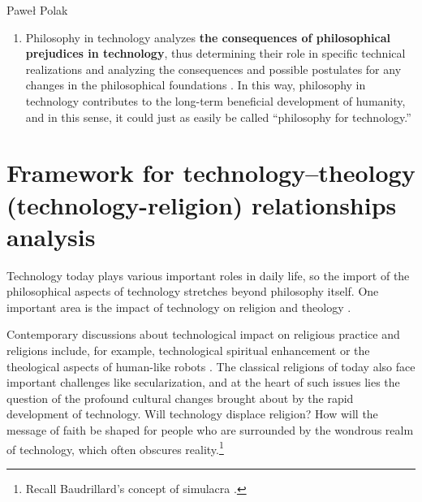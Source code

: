 \begin{artengenv}{Paweł Polak}
\begin{enumerate}[label=(\Roman*)]
\item Philosophy in technology analyzes \textbf{the consequences of philosophical prejudices in technology}, thus determining their role in specific technical realizations and analyzing the consequences and possible postulates for any changes in the philosophical foundations 
\parencites[e.g][]{smith_promise_2019}[][]{suchacka_human_2021}[][]{wieczorek_conscience_2021}. %
 In this way, philosophy in technology contributes to the long-term beneficial development of humanity, and in this sense, it could just as easily be called ``philosophy for technology.''
\end{enumerate}


\section[Framework for technology–theology (technology-religion) relationships analysis]{Framework for technology–theology (technology-religion) relationships analysis\footnotemark}


Technology today plays various important roles in daily life, so the import of the philosophical aspects of technology stretches beyond philosophy itself. One important area is the impact of technology on religion and theology 
\parencite[e.g][]{salamon_religia_2016}.%




Contemporary discussions about technological impact on religious practice and religions include, for example, technological spiritual enhancement 
\parencite[e.g][]{wildman_spirit_2021} %
 or the theological aspects of human-like robots 
\parencite[][]{balle_theological_2022}. %
 The classical religions of today also face important challenges like secularization, and at the heart of such issues lies the question of the profound cultural changes brought about by the rapid development of technology. Will technology displace religion? How will the message of faith be shaped for people who are surrounded by the wondrous realm of technology, which often obscures reality.\footnote{Recall Baudrillard's concept of simulacra 
\parencite[][]{baudrillard_simulacra_1994}.%
}




\end{artengenv}
